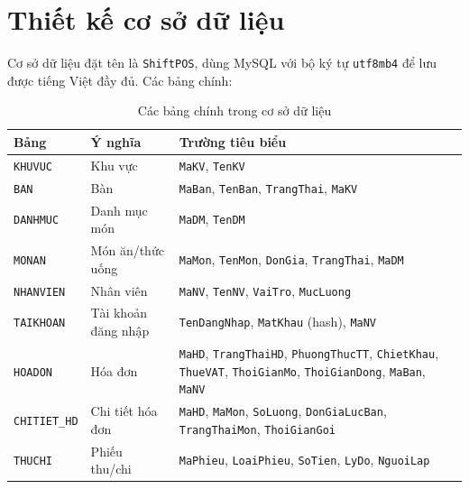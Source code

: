 \documentclass[12pt,a4paper]{report}
\newcommand{\code}[1]{\texttt{#1}}
\begin{document}
\section{Thiết kế cơ sở dữ liệu}

Cơ sở dữ liệu đặt tên là \code{ShiftPOS}, dùng MySQL với bộ ký tự \code{utf8mb4} để lưu được tiếng Việt đầy đủ. Các bảng chính:

\begin{table}[H]
\centering
\caption{Các bảng chính trong cơ sở dữ liệu}
\begin{tabularx}{\textwidth}{L{2.8cm} L{3.5cm} X}
\toprule
\textbf{Bảng} & \textbf{Ý nghĩa} & \textbf{Trường tiêu biểu} \\
\midrule
\code{KHUVUC} & Khu vực & \code{MaKV}, \code{TenKV} \\
\code{BAN} & Bàn & \code{MaBan}, \code{TenBan}, \code{TrangThai}, \code{MaKV} \\
\code{DANHMUC} & Danh mục món & \code{MaDM}, \code{TenDM} \\
\code{MONAN} & Món ăn/thức uống & \code{MaMon}, \code{TenMon}, \code{DonGia}, \code{TrangThai}, \code{MaDM} \\
\code{NHANVIEN} & Nhân viên & \code{MaNV}, \code{TenNV}, \code{VaiTro}, \code{MucLuong} \\
\code{TAIKHOAN} & Tài khoản đăng nhập & \code{TenDangNhap}, \code{MatKhau} (hash), \code{MaNV} \\
\code{HOADON} & Hóa đơn & \code{MaHD}, \code{TrangThaiHD}, \code{PhuongThucTT}, \code{ChietKhau}, \code{ThueVAT}, \code{ThoiGianMo}, \code{ThoiGianDong}, \code{MaBan}, \code{MaNV} \\
\code{CHITIET\_HD} & Chi tiết hóa đơn & \code{MaHD}, \code{MaMon}, \code{SoLuong}, \code{DonGiaLucBan}, \code{TrangThaiMon}, \code{ThoiGianGoi} \\
\code{THUCHI} & Phiếu thu/chi & \code{MaPhieu}, \code{LoaiPhieu}, \code{SoTien}, \code{LyDo}, \code{NguoiLap} \\
\bottomrule
\end{tabularx}
\end{table}
\end{document}
